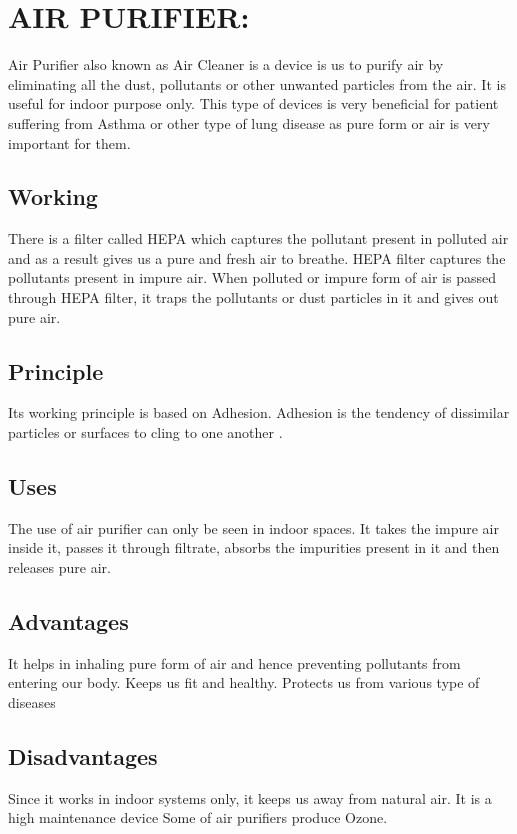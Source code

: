 \documentclass[12pt]{article}
\begin{document}
\section{AIR PURIFIER:}

Air Purifier also known as Air Cleaner is a device is us to purify air by eliminating all the dust, pollutants or other unwanted particles from the air. It is useful for indoor purpose only. This type of devices is very beneficial for patient suffering from Asthma or other type of lung disease as pure form or air is very important for them.




\subsection{Working}
There is a filter called HEPA which captures the pollutant present in polluted air and as a result gives us a pure and fresh air to breathe. HEPA filter captures the pollutants present in impure air. When polluted or impure form of air is passed through HEPA filter, it traps the pollutants or dust particles in it and gives out pure air.


\subsection{Principle}

Its working principle is based on Adhesion. Adhesion is the tendency of dissimilar particles or surfaces to cling to one another .


\subsection{Uses}
The use of air purifier can only be seen in indoor spaces. It takes the impure air inside it, passes it through filtrate, absorbs the impurities present in it and then releases pure air.


\subsection{Advantages}

It helps in inhaling pure form of air and hence preventing pollutants from entering our body.
Keeps us fit and healthy.
Protects us from various type of diseases

\subsection{Disadvantages}
Since it works in indoor systems only, it keeps us away from natural air.
It is a high maintenance device
Some of air purifiers produce Ozone.
\end{document}
